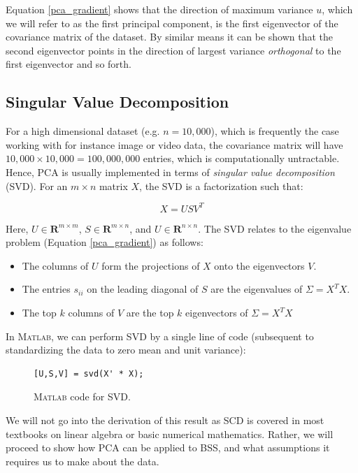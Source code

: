\documentclass[11pt, oneside, a4paper]{report}
\begin{document}
Equation \ref{pca_gradient} shows that the direction of maximum variance $u$, which we will refer to as the first principal component, is the first eigenvector of the covariance matrix of the dataset. By similar means it can be shown that the second eigenvector points in the direction of largest variance \emph{orthogonal} to the first eigenvector and so forth.

\subsection{Singular Value Decomposition}

For a high dimensional dataset (e.g. $n = 10,000$), which is
frequently the case working with for instance image or video data, the covariance matrix will have $10,000\times 10,000 = 100,000,000$ entries, which is computationally untractable. Hence, PCA is usually implemented in terms of \emph{singular value decomposition} (SVD). For an $m\times n$ matrix $X$, the SVD is a factorization such that:

\begin{equation}
  X = US V^{T}
\end{equation}

Here, $U \in \mathbf{R}^{m\times m}$, $S \in \mathbf{R}^{m\times n}$,
and $U \in \mathbf{R}^{n\times n}$. The SVD relates to the eigenvalue
problem (Equation \ref{pca_gradient}) as follows:

\begin{itemize}
\item The columns of $U$ form the projections of $X$ onto the
  eigenvectors $V$.
  \item The entries $s_{ii}$ on the leading diagonal of $S$ are the
    eigenvalues of $\Sigma = X^TX$.
  \item The top $k$ columns of $V$ are the top $k$ eigenvectors of
    $\Sigma = X^T X$
\end{itemize}

In \textsc{Matlab}, we can perform SVD by a single line of code
(subsequent to standardizing the data to zero mean and unit variance):

\begin{figure}[!htpb]
  \begin{lstlisting}[frame=single]
   [U,S,V] = svd(X' * X);
  \end{lstlisting}
  \caption{\textsc{Matlab} code for SVD.}
  \label{svd_code}
\end{figure}

We will not go into the derivation of this result as SCD is covered
in most textbooks on linear algebra or basic numerical
mathematics. Rather, we will proceed to show how PCA can be applied to
BSS, and what assumptions it requires us to make about the data.
\end{document}
